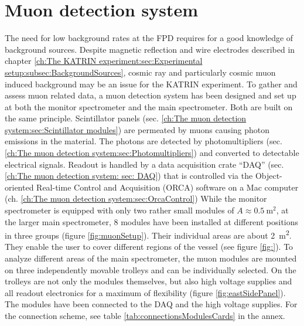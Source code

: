 
\chapter{Muon detection system}
\label{ch:The muon detection system}
  The need for low background rates at the FPD requires for a good knowledge of background sources. Despite magnetic reflection and wire electrodes described in chapter \ref{ch:The KATRIN experiment:sec:Experimental setup:subsec:BackgroundSources}, cosmic ray and particularly cosmic muon induced background may be an issue for the KATRIN experiment. To gather and assess muon related data, a muon detection system has been designed and set up at both the monitor spectrometer and the main spectrometer. Both are built on the same principle. Scintillator panels (sec. \ref{ch:The muon detection system:sec:Scintillator modules}) are permeated by muons causing photon emissions in the material. The photons are detected by photomultipliers (sec. \ref{ch:The muon detection system:sec:Photomultipliers}) and converted to detectable electrical signals. Readout is handled by a data acquisition crate ``DAQ'' (sec. \ref{ch:The muon detection system: sec: DAQ}) that is controlled via the Object-oriented Real-time Control and Acquisition\cite{How09} (ORCA) software on a Mac computer (ch. \ref{ch:The muon detection system:sec:OrcaControl})
  While the monitor spectrometer is equipped with only two rather small modules of $A \approx \SI{0.5}{\square\meter}$, at the larger main spectrometer, 8 modules have been installed at different positions in three groups (figure \ref{fig:muonSetup}). Their individual areas are about \SI{2}{\square\meter}. They enable the user to cover different regions of the vessel (see figure \ref{fig:}). To analyze different areas of the main spectrometer, the muon modules are mounted on three independently movable trolleys and can be individually selected. On the trolleys are not only the modules themselves, but also high voltage supplies and all readout electronics for a maximum of flexibility (figure \ref{fig:eastSidePanel}).
  The modules have been connected to the DAQ and the high voltage supplies. For the connection scheme, see table \ref{tab:connectionsModulesCards} in the annex.
  
